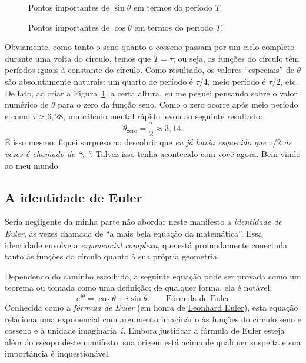 \begin{figure}
\begin{center}
\end{center}
\caption{Pontos importantes de $\sin\theta$ em termos do período $T$.\label{fig:sine_with_tau}}
\end{figure}

\begin{figure}
\begin{center}
\end{center}
\caption{Pontos importantes de $\cos\theta$ em termos do período $T$.\label{fig:cosine_with_tau}}
\end{figure}

Obviamente, como tanto o seno quanto o cosseno passam por um ciclo completo durante uma volta do círculo, temos que $T = \tau$; ou seja, as funções do círculo têm períodos iguais à constante do círculo. Como resultado, os valores ``especiais'' de $\theta$ são absolutamente naturais: um quarto de período é $\tau/4$, meio período é $\tau/2$, etc. De fato, ao criar a Figura~\ref{fig:sine_with_tau}, a certa altura, eu me peguei pensando sobre o valor numérico de $\theta$ para o zero da função seno. Como o zero ocorre após meio período e como $\tau \approx 6,28$, um cálculo mental rápido levou ao seguinte resultado:
\[
  \theta_\mathrm{zero} = \frac{\tau}{2} \approx 3,14.
\]
É isso mesmo: fiquei surpreso ao descobrir que \emph{eu já havia esquecido que $\tau/2$ às vezes é chamado de ``$\pi$''}. Talvez isso tenha acontecido com você agora. Bem-vindo ao meu mundo.



   \subsection{A identidade de Euler} %
   \label{sec:euler_s_identity}

Seria negligente da minha parte não abordar neste manifesto a \emph{identidade de Euler}, às vezes chamada de ``a mais bela equação da matemática''. Essa identidade envolve a \emph{exponencial complexa}, que está profundamente conectada tanto às funções do círculo quanto à sua própria geometria.

Dependendo do caminho escolhido, a seguinte equação pode ser provada como um teorema ou tomada como uma definição; de qualquer forma, ela é notável:
\begin{equation}
\label{eq:eulers_formula}
e^{i\theta} = \cos\theta + i\sin\theta. \qquad\mbox{Fórmula de Euler}
\end{equation}
Conhecida como a \emph{fórmula de Euler} (em honra de \href{https://pt.wikipedia.org/wiki/Leonhard_Euler}{Leonhard Euler}), esta equação relaciona uma exponencial com argumento imaginário às funções do círculo seno e cosseno e à unidade imaginária~$i$. Embora justificar a fórmula de Euler esteja além do escopo deste manifesto, sua origem está acima de qualquer suspeita e sua importância é inquestionável.

